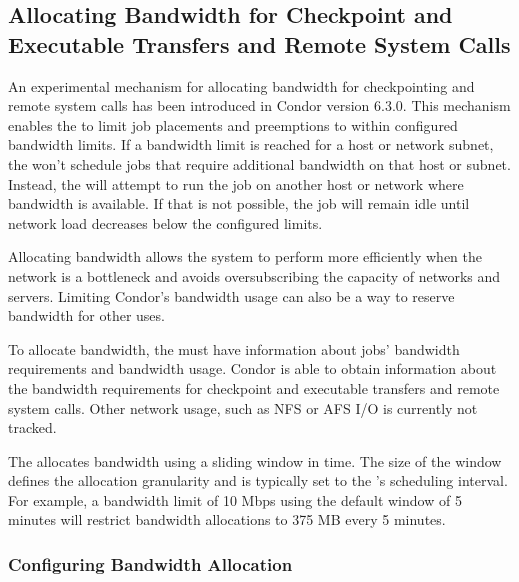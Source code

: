 \subsection{\label{sec:Bandwidth-Alloc}
Allocating Bandwidth for Checkpoint and Executable Transfers
and Remote System Calls}

An experimental mechanism for allocating bandwidth for checkpointing
and remote system calls has been introduced in Condor version 6.3.0.
This mechanism enables the  to limit job placements
and preemptions to within configured bandwidth limits.
If a bandwidth limit is reached for a host or network subnet, the
 won't schedule jobs that require additional
bandwidth on that host or subnet.
Instead, the  will attempt to run the job on
another host or network where bandwidth is available.
If that is not possible, the job will remain idle until network load
decreases below the configured limits.

Allocating bandwidth allows the system to perform more efficiently
when the network is a bottleneck and avoids oversubscribing the
capacity of networks and servers.
Limiting Condor's bandwidth usage can also be a way to reserve
bandwidth for other uses.

To allocate bandwidth, the  must have information
about jobs' bandwidth requirements and bandwidth usage.
Condor is able to obtain information about the bandwidth requirements
for checkpoint and executable transfers and remote system calls.
Other network usage, such as NFS or AFS I/O is currently not tracked.

The  allocates bandwidth using a sliding window in
time.
The size of the window defines the allocation granularity and is
typically set to the 's scheduling interval.
For example, a bandwidth limit of 10 Mbps using the default window of
5 minutes will restrict bandwidth allocations to 375 MB every 5
minutes.

\subsubsection{\label{sec:Bandwidth-Alloc-Configure}
Configuring Bandwidth Allocation}

